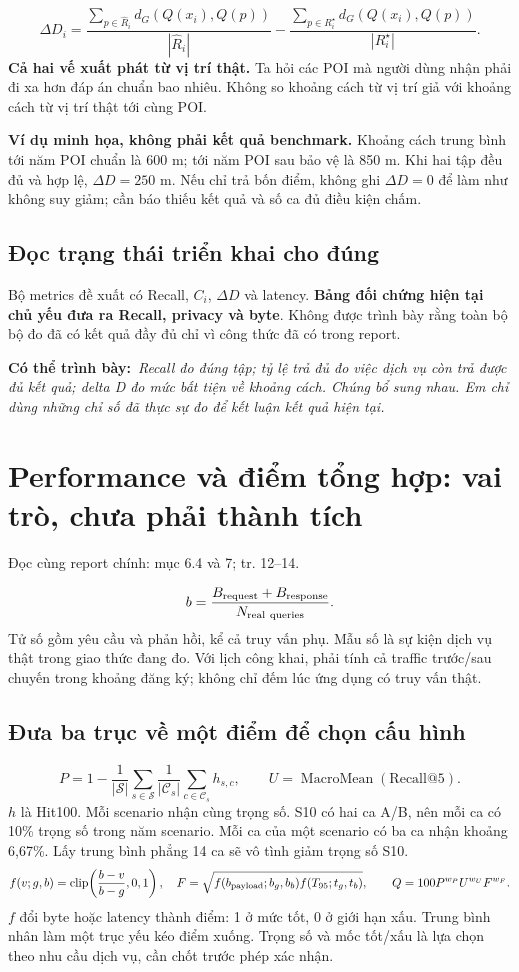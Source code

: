 \documentclass[10pt,a4paper]{article}
\newcommand{\say}[1]{\par\textbf{Có thể trình bày:}\ \textit{#1}\par}
\newcommand{\where}[1]{\par{\small\color{gray}Đọc cùng report chính: #1.}\par}
\newcommand{\example}{\textbf{Ví dụ minh họa, không phải kết quả benchmark.} }
\newcommand{\guidepage}[1]{\clearpage\section{#1}}
\begin{document}
\[
\Delta D_i=\frac{\sum_{p\in\widehat R_i}d_G(Q(x_i),Q(p))}{|\widehat R_i|}
-\frac{\sum_{p\in R_i^\star}d_G(Q(x_i),Q(p))}{|R_i^\star|}.
\]
\textbf{Cả hai vế xuất phát từ vị trí thật.} Ta hỏi các POI mà người dùng nhận phải đi xa hơn đáp án chuẩn bao nhiêu. Không so khoảng cách từ vị trí giả với khoảng cách từ vị trí thật tới cùng POI.

\example Khoảng cách trung bình tới năm POI chuẩn là 600 m; tới năm POI sau bảo vệ là 850 m. Khi hai tập đều đủ và hợp lệ, $\Delta D=250$ m. Nếu chỉ trả bốn điểm, không ghi $\Delta D=0$ để làm như không suy giảm; cần báo thiếu kết quả và số ca đủ điều kiện chấm.

\subsection*{Đọc trạng thái triển khai cho đúng}
Bộ metrics đề xuất có Recall, $C_i$, $\Delta D$ và latency. \textbf{Bảng đối chứng hiện tại chủ yếu đưa ra Recall, privacy và byte}. Không được trình bày rằng toàn bộ bộ đo đã có kết quả đầy đủ chỉ vì công thức đã có trong report.
\say{Recall đo đúng tập; tỷ lệ trả đủ đo việc dịch vụ còn trả được đủ kết quả; delta D đo mức bất tiện về khoảng cách. Chúng bổ sung nhau. Em chỉ dùng những chỉ số đã thực sự đo để kết luận kết quả hiện tại.}

\guidepage{Performance và điểm tổng hợp: vai trò, chưa phải thành tích}
\where{mục 6.4 và 7; tr. 12--14}
\[
b=\frac{B_{\rm request}+B_{\rm response}}{N_{\rm real\ queries}}.
\]
Tử số gồm yêu cầu và phản hồi, kể cả truy vấn phụ. Mẫu số là sự kiện dịch vụ thật trong giao thức đang đo. Với lịch công khai, phải tính cả traffic trước/sau chuyến trong khoảng đăng ký; không chỉ đếm lúc ứng dụng có truy vấn thật.

\subsection*{Đưa ba trục về một điểm để chọn cấu hình}
\[
P=1-\frac1{|\mathcal S|}\sum_{s\in\mathcal S}\frac1{|\mathcal C_s|}\sum_{c\in\mathcal C_s}h_{s,c},
\qquad U=\operatorname{MacroMean}(\mathrm{Recall@5}).
\]
$h$ là Hit100. Mỗi scenario nhận cùng trọng số. S10 có hai ca A/B, nên mỗi ca có 10\% trọng số trong năm scenario. Mỗi ca của một scenario có ba ca nhận khoảng 6,67\%. Lấy trung bình phẳng 14 ca sẽ vô tình giảm trọng số S10.
\[
f(v;g,b)=\operatorname{clip}\!\left(\frac{b-v}{b-g},0,1\right),\quad
F=\sqrt{f(b_{\rm payload};b_g,b_b)f(T_{95};t_g,t_b)},\qquad
Q=100P^{w_P}U^{w_U}F^{w_F}.
\]
$f$ đổi byte hoặc latency thành điểm: 1 ở mức tốt, 0 ở giới hạn xấu. Trung bình nhân làm một trục yếu kéo điểm xuống. Trọng số và mốc tốt/xấu là lựa chọn theo nhu cầu dịch vụ, cần chốt trước phép xác nhận.
\end{document}
